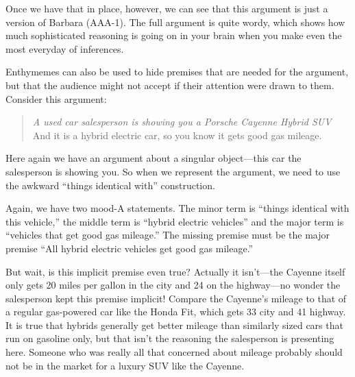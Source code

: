 \begin{kormanize}
\end{kormanize}

Once we have that in place, however, we can see that this argument is just a version of Barbara (AAA-1). The full argument is quite wordy, which shows how much sophisticated reasoning is going on in your brain when you make even the most everyday of inferences.

Enthymemes can also be used to hide premises that are needed for the argument, but that the audience might not accept if their attention were drawn to them. Consider this argument:

\begin{quotation}\noindent \textit{A used car salesperson is showing you a Porsche Cayenne Hybrid SUV} And it is a hybrid electric car, so you know it gets good gas mileage. \end{quotation}

Here again we have an argument about a singular object---this car the salesperson is showing you. So when we represent the argument, we need to use the awkward ``things identical with'' construction.

\begin{kormanize}
\end{kormanize}

Again, we have two mood-A statements. The minor term is ``things identical with this vehicle,'' the middle term is ``hybrid electric vehicles'' and the major term is ``vehicles that get good gas mileage.'' The missing premise must be the major premise ``All hybrid electric vehicles get good gas mileage.''

\begin{kormanize}
\end{kormanize}

But wait, is this implicit premise even true? Actually it isn't---the Cayenne itself only gets 20 miles per gallon in the city and 24 on the highway---no wonder the salesperson kept this premise implicit! Compare the Cayenne's mileage to that of a regular gas-powered car like the Honda Fit, which gets 33 city and 41 highway. It is true that hybrids generally get better mileage than similarly sized cars that run on gasoline only, but that isn't the reasoning the salesperson is presenting here. Someone who was really all that concerned about mileage probably should not be in the market for a luxury SUV like the Cayenne.

